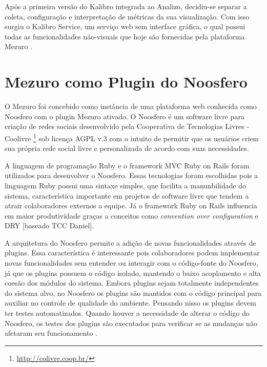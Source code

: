 Após a primeira versão do Kalibro integrada ao Analizo, decidiu-se separar a coleta, configuração e interpretação de métricas da sua visualização. Com isso surgiu o Kalibro Service, um serviço web sem interface gráfica, o qual possui todas as funcionalidades não-visuais que hoje são fornecidas pela plataforma Mezuro \cite{meirelles2013metrics}.


\section{Mezuro como Plugin do Noosfero}

O Mezuro foi concebido como instância de uma plataforma web conhecida como Noosfero com o plugin Mezuro ativado. O Noosfero é um software livre para criação de redes sociais desenvolvido pela Cooperativa de Tecnologias Livres - Coolivre \footnote{\url{http://colivre.coop.br/}} sob licença AGPL v.3 com o intuito de permitir que os usuários criem sua própria rede social livre e personalizada de acordo com suas necessidades.

A linguagem de programação Ruby e o framework MVC Ruby on Rails foram utilizados para desenvolver o Noosfero. Essas tecnologias foram escolhidas pois a linguagem Ruby possui uma sintaxe simples, que facilita a manunbilidade do sistema, característica importante em projetos de software livre que tendem a atrair colaboradores externos a equipe. Já o framework Ruby on Rails influencia em maior produtividade graças a conceitos como \textit{convention over configuration} e DRY [baseado TCC Daniel].

A arquitetura do Noosfero permite a adição de novas funcionalidades através de plugins. Essa característica é interessante pois colaboradores podem implementar novas funcionalidades sem entender ou interagir com o código-fonte do Noosfero, já que os plugins possuem o código isolado, mantendo o baixo acoplamento e alta coesão dos módulos do sistema. Embora plugins sejam totalmente independentes do sistema alvo, no Noosfero os plugins são mantidos com o código principal para auxiliar no controle de qualidade do ambiente. Pensando nisso os plugins devem ter testes automatizados. Quando houver a necessidade de alterar o código do Noosfero, os testes dos plugins são executados para verificar se as mudanças não afetaram seu funcionamento \cite{noosfero2013plugins}.

